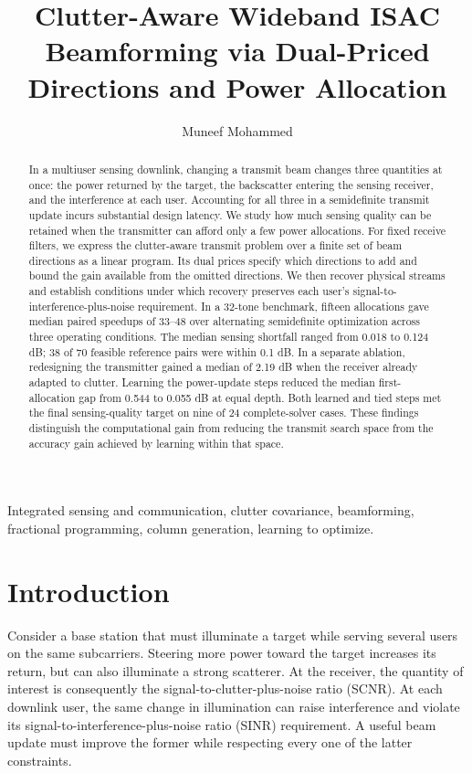 \documentclass[journal]{IEEEtran}
\title{Clutter-Aware Wideband ISAC Beamforming via Dual-Priced Directions and Power Allocation}
\author{Muneef Mohammed}
\begin{document}
\maketitle
\setlength{\abovedisplayskip}{7pt plus 2pt minus 2pt}
\setlength{\belowdisplayskip}{7pt plus 2pt minus 2pt}
\setlength{\jot}{2pt}
\begin{abstract}
In a multiuser sensing downlink, changing a transmit beam changes three quantities at once: the power returned by the target, the backscatter entering the sensing receiver, and the interference at each user. Accounting for all three in a semidefinite transmit update incurs substantial design latency. We study how much sensing quality can be retained when the transmitter can afford only a few power allocations. For fixed receive filters, we express the clutter-aware transmit problem over a finite set of beam directions as a linear program. Its dual prices specify which directions to add and bound the gain available from the omitted directions. We then recover physical streams and establish conditions under which recovery preserves each user's signal-to-interference-plus-noise requirement. In a 32-tone benchmark, fifteen allocations gave median paired speedups of 33--48 over alternating semidefinite optimization across three operating conditions. The median sensing shortfall ranged from 0.018 to 0.124 dB; 38 of 70 feasible reference pairs were within 0.1 dB. In a separate ablation, redesigning the transmitter gained a median of 2.19 dB when the receiver already adapted to clutter. Learning the power-update steps reduced the median first-allocation gap from 0.544 to 0.055 dB at equal depth. Both learned and tied steps met the final sensing-quality target on nine of 24 complete-solver cases. These findings distinguish the computational gain from reducing the transmit search space from the accuracy gain achieved by learning within that space.
\end{abstract}
\begin{IEEEkeywords}
Integrated sensing and communication, clutter covariance, beamforming, fractional programming, column generation, learning to optimize.
\end{IEEEkeywords}

\section{Introduction}
Consider a base station that must illuminate a target while serving several users on the same subcarriers. Steering more power toward the target increases its return, but can also illuminate a strong scatterer. At the receiver, the quantity of interest is consequently the signal-to-clutter-plus-noise ratio (SCNR). At each downlink user, the same change in illumination can raise interference and violate its signal-to-interference-plus-noise ratio (SINR) requirement. A useful beam update must improve the former while respecting every one of the latter constraints.
\end{document}
